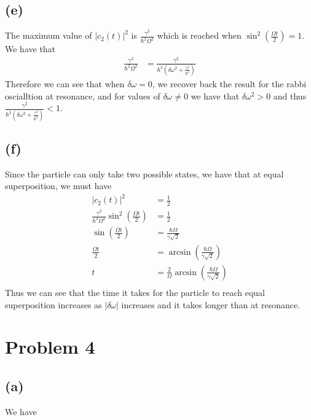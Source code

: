 \documentclass[11pt]{article}
\begin{document}
\subsection*{(e)}
The maximum value of $|c_2(t)|^2$ is $\frac{\gamma^2}{\hbar^2\Omega^2}$ which is reached when $\sin^2\left(\frac{\Omega t}{2}\right) = 1$.
We have that 
\begin{align*}
    \frac{\gamma^2}{\hbar^2\Omega^2} &= \frac{\gamma^2}{\hbar^2(\delta\omega^2+\frac{\gamma^2}{\hbar^2})}
\end{align*}
Therefore we can see that when $\delta\omega=0$, we recover back the result for the 
rabbi oscialltion at resonance, and for values of $\delta\omega\neq 0$ we have that 
$\delta\omega^2>0$ and thus $\frac{\gamma^2}{\hbar^2(\delta\omega^2+\frac{\gamma^2}{\hbar^2})}<1$.
\subsection*{(f)}
Since the particle can only take two possible states, 
we have that at equal superposition, we must have 
\begin{align*}
    |c_{2}(t)|^2 &= \frac{1}{2}\\
    \frac{\gamma^2}{\hbar^2\Omega^2}\sin^2\left(\frac{\Omega t}{2}\right) &= \frac{1}{2}\\
    \sin\left(\frac{\Omega t}{2}\right) &= \frac{\hbar \Omega}{\gamma\sqrt{2}}\\
    \frac{\Omega t}{2} &= \arcsin\left(\frac{\hbar \Omega}{\gamma\sqrt{2}}\right)\\
    t &= \frac{2}{\Omega}\arcsin\left(\frac{\hbar \Omega}{\gamma\sqrt{2}}\right)\\
\end{align*}
Thus we can see that the time it takes for the particle to reach equal superposition increases
as $|\delta\omega|$ increases and it takes longer than 
at resonance.
\section*{Problem 4}
\subsection*{(a)}
We have 
\end{document}
